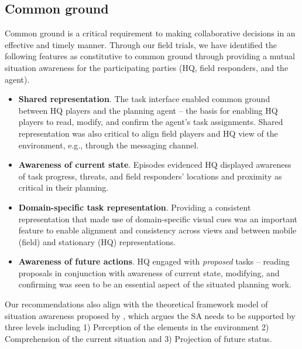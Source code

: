 \subsection{Common ground}
Common ground is a critical requirement to making collaborative decisions in an effective and timely manner. Through our field trials, we have identified the following features as constitutive to common ground through providing a mutual situation awareness for the participating parties (HQ, field responders, and the agent).
\begin{itemize}
\item \textbf{Shared representation}. The task interface enabled common ground between HQ players and the planning agent -- the basis for enabling HQ players to read, modify, and confirm the agent's task assignments. Shared representation was also critical to align field players and HQ view of the environment, e.g., through the messaging channel.  
\item \textbf{Awareness of current state}. Episodes evidenced HQ displayed awareness of task progress, threats, and field responders' locations and proximity as critical in their planning.  
\item \textbf{Domain-specific task representation}. Providing a consistent representation that made use of domain-specific visual cues was an important feature to enable alignment and consistency across views and between mobile (field) and stationary (HQ) representations. 
\item \textbf{Awareness of future actions}. HQ engaged with \textit{proposed} tasks -- reading proposals in conjunction with awareness of current state, modifying, and confirming was seen to be an essential aspect of the situated planning work. 
\end{itemize}

Our recommendations also align with the theoretical framework model of situation awareness proposed by \cite{Endsley2001}, which argues the SA needs to be supported by three levels including 1) Perception of the elements in the environment 2) Comprehension of the current situation and 3) Projection of future status.\\ 


